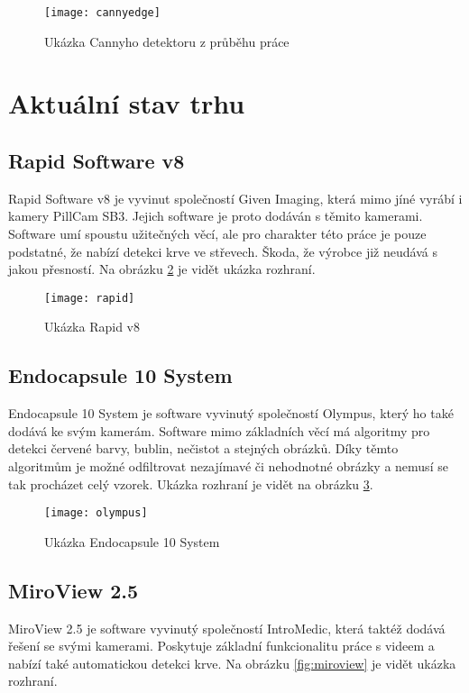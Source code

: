 \begin{figure}[h]
	\texttt{[image: cannyedge]}
	\centering
	\caption{Ukázka Cannyho detektoru z průběhu práce}\label{fig:cannyedge}
\end{figure}


\section{Aktuální stav trhu}
\subsection{Rapid Software v8}
Rapid Software v8 je vyvinut společností Given Imaging, která mimo jíné vyrábí i kamery PillCam SB3. Jejich software je proto dodáván s těmito kamerami. Software umí spoustu užitečných věcí, ale pro charakter této práce je pouze podstatné, že nabízí detekci krve ve střevech. Škoda, že výrobce již neudává s jakou přesností. Na obrázku \ref{fig:rapid} je vidět ukázka rozhraní.\cite{pillcam}

\begin{figure}[h]
	\texttt{[image: rapid]}
	\centering
	\caption{Ukázka Rapid v8\cite{rapidsoftware}\label{fig:rapid}}
\end{figure} 
\FloatBarrier

\subsection{Endocapsule 10 System}
Endocapsule 10 System je software vyvinutý společností Olympus, který ho také dodává ke svým kamerám. Software mimo základních věcí má algoritmy pro detekci červené barvy, bublin, nečistot a stejných obrázků. Díky těmto algoritmům je možné odfiltrovat nezajímavé či nehodnotné obrázky a nemusí se tak procházet celý vzorek. Ukázka rozhraní je vidět na obrázku \ref{fig:olympus}.\cite{endocapsule}

\begin{figure}[h]
	\texttt{[image: olympus]}
	\centering
	\caption{Ukázka Endocapsule 10 System \cite{olympuseuropa}\label{fig:olympus}}
\end{figure}
\FloatBarrier

\subsection{MiroView 2.5}
MiroView 2.5 je software vyvinutý společností IntroMedic, která taktéž dodává řešení se svými kamerami. Poskytuje základní funkcionalitu práce s videem a nabízí také automatickou detekci krve. Na obrázku \ref{fig:miroview} je vidět ukázka rozhraní.\cite{intromedic}

